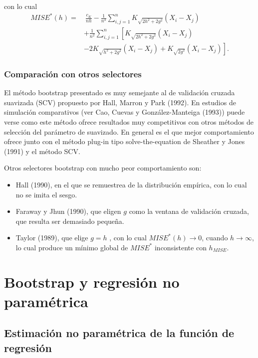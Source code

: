 \documentclass[]{book}
\theoremstyle{definition}
\theoremstyle{definition}
\theoremstyle{definition}
\theoremstyle{remark}
\begin{document}
con lo cual \[\begin{aligned}
MISE^{\ast}\left( h \right) =&\ \frac{c_{K}}{nh}-\frac{1}{n^{3}}
\sum_{i,j=1}^{n}K_{\sqrt{2h^2+2g^2}}\left( X_i-X_j \right) \\
&+\frac{1}{n^2}\sum_{i,j=1}^{n}\left[ K_{\sqrt{2h^2+2g^2}}\left(
X_i-X_j \right) \right. \\
&\left. -2K_{\sqrt{h^2+2g^2}}\left( X_i-X_j \right) +K_{\sqrt{2g^2}
}\left( X_i-X_j \right) \right] .
\end{aligned}\]

\subsection{Comparación con otros
selectores}\label{comparacion-con-otros-selectores}

El método bootstrap presentado es muy semejante al de validación cruzada
suavizada (SCV) propuesto por Hall, Marron y Park (1992). En estudios de
simulación comparativos (ver Cao, Cuevas y González-Manteiga (1993))
puede verse como este método ofrece resultados muy competitivos con
otros métodos de selección del parámetro de suavizado. En general es el
que mejor comportamiento ofrece junto con el método plug-in tipo
solve-the-equation de Sheather y Jones (1991) y el método SCV.

Otros selectores bootstrap con mucho peor comportamiento son:

\begin{itemize}
\item
  Hall (1990), en el que se remuestrea de la distribución empírica, con
  lo cual no se imita el sesgo.
\item
  Faraway y Jhun (1990), que eligen \(g\) como la ventana de validación
  cruzada, que resulta ser demasiado pequeña.
\item
  Taylor (1989), que elige \(g=h\) , con lo cual
  \(MISE^{\ast}\left( h \right) \rightarrow 0\), cuando
  \(h\rightarrow \infty\), lo cual produce un mínimo global de
  \(MISE^{\ast}\) inconsistente con \(h_{MISE}\).
\end{itemize}

\chapter{Bootstrap y regresión no paramétrica}\label{cap7}

\section{Estimación no paramétrica de la función de
regresión}\label{estimacion-no-parametrica-de-la-funcion-de-regresion}
\end{document}
